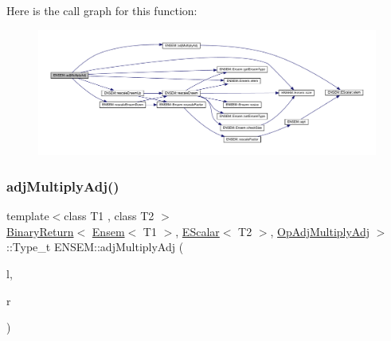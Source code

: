 Here is the call graph for this function\+:\nopagebreak
\begin{figure}[H]
\begin{center}
\leavevmode
\includegraphics[width=350pt]{d1/d9e/group__eensem_gaf92e62b8e69b299d4f4193702fb8dab3_cgraph}
\end{center}
\end{figure}
\mbox{\label{group__eensem_gac275cf78eef2b465d5278ed910042f03}} 
\subsubsection{\texorpdfstring{adjMultiplyAdj()}{adjMultiplyAdj()}\hspace{0.1cm}{\footnotesize\ttfamily [2/3]}}
{\footnotesize\ttfamily template$<$class T1 , class T2 $>$ \\
\mbox{\hyperlink{structENSEM_1_1BinaryReturn}{Binary\+Return}}$<$ \mbox{\hyperlink{classENSEM_1_1Ensem}{Ensem}}$<$ T1 $>$, \mbox{\hyperlink{classENSEM_1_1EScalar}{E\+Scalar}}$<$ T2 $>$, \mbox{\hyperlink{structENSEM_1_1OpAdjMultiplyAdj}{Op\+Adj\+Multiply\+Adj}} $>$\+::Type\+\_\+t E\+N\+S\+E\+M\+::adj\+Multiply\+Adj (\begin{DoxyParamCaption}\item[{const \mbox{\hyperlink{classENSEM_1_1Ensem}{Ensem}}$<$ T1 $>$ \&}]{l,  }\item[{const \mbox{\hyperlink{classENSEM_1_1EScalar}{E\+Scalar}}$<$ T2 $>$ \&}]{r }\end{DoxyParamCaption})\hspace{0.3cm}{\ttfamily [inline]}}

